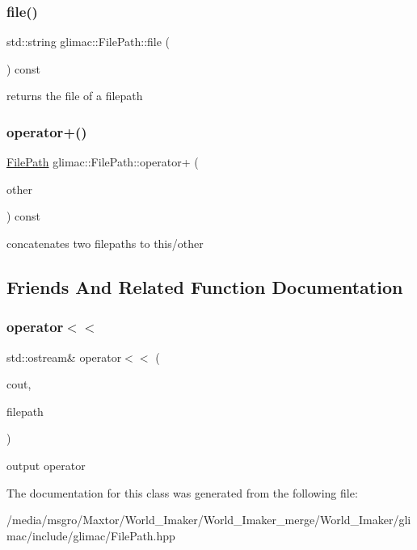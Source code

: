 \subsubsection{\texorpdfstring{file()}{file()}}
{\footnotesize\ttfamily std\+::string glimac\+::\+File\+Path\+::file (\begin{DoxyParamCaption}{ }\end{DoxyParamCaption}) const\hspace{0.3cm}{\ttfamily [inline]}}

returns the file of a filepath \mbox{\label{classglimac_1_1FilePath_a8113825c73d8a8f1f1cf3ca57de6bad8}} 
\subsubsection{\texorpdfstring{operator+()}{operator+()}}
{\footnotesize\ttfamily \hyperlink{classglimac_1_1FilePath}{File\+Path} glimac\+::\+File\+Path\+::operator+ (\begin{DoxyParamCaption}\item[{const \hyperlink{classglimac_1_1FilePath}{File\+Path} \&}]{other }\end{DoxyParamCaption}) const\hspace{0.3cm}{\ttfamily [inline]}}

concatenates two filepaths to this/other 

\subsection{Friends And Related Function Documentation}
\mbox{\label{classglimac_1_1FilePath_a924c4e68c4618cf40156646d23ec5f1c}} 
\subsubsection{\texorpdfstring{operator$<$$<$}{operator<<}}
{\footnotesize\ttfamily std\+::ostream\& operator$<$$<$ (\begin{DoxyParamCaption}\item[{std\+::ostream \&}]{cout,  }\item[{const \hyperlink{classglimac_1_1FilePath}{File\+Path} \&}]{filepath }\end{DoxyParamCaption})\hspace{0.3cm}{\ttfamily [friend]}}

output operator 

The documentation for this class was generated from the following file\+:\begin{DoxyCompactItemize}
\item 
/media/msgro/\+Maxtor/\+World\+\_\+\+Imaker/\+World\+\_\+\+Imaker\+\_\+merge/\+World\+\_\+\+Imaker/glimac/include/glimac/File\+Path.\+hpp\end{DoxyCompactItemize}
